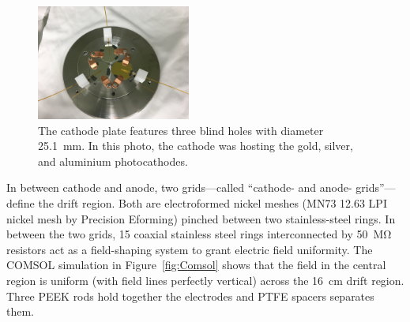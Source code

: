 \documentclass[a4paper,11pt]{article}
\begin{document}
\begin{figure}[t]
	\begin{center}
	\includegraphics[width=0.45\textwidth, trim={35cm 20cm 40cm 20cm}, clip=true]{figures/cathode_plate.JPG}			
	\caption[]{The cathode plate features three blind holes with diameter \SI{25.1}{mm}. In this photo, the cathode was hosting the gold, silver, and aluminium photocathodes.}
	\label{fig:cathode_plate}
	\end{center}	
\end{figure}

In between cathode and anode, two grids---called ``cathode- and anode- grids''---define the drift region. Both are electroformed nickel meshes (MN73 12.63 LPI nickel mesh by Precision Eforming) pinched between two stainless-steel rings. 
In between the two grids, 15 coaxial stainless steel rings interconnected by \SI{50}{\mega\ohm} resistors act as a field-shaping system to grant electric field uniformity. The COMSOL simulation in Figure~\ref{fig:Comsol} shows that the field in the central region is uniform (with field lines perfectly vertical) across the \SI{16}{cm} drift region. Three PEEK rods hold together the electrodes and PTFE spacers separates them. 
\end{document}
